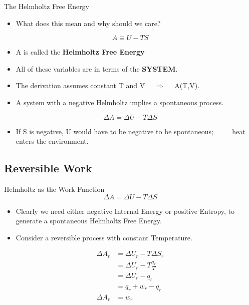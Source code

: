 \documentclass[t,10pt,mathserif,xcolor=pst,pdftex]{beamer}
\newcommand{\be}{\begin{equation}}
\newcommand{\ee}{\end{equation}}
\begin{document}
\begin{frame}{The Helmholtz Free Energy}
\begin{itemize}
\item What does this mean and why should we care?
\end{itemize}
\be
A \equiv U - TS
\ee

\begin{itemize}
\item A is called the \textbf{Helmholtz Free Energy}
\end{itemize}

\begin{itemize}
\item All of these variables are in terms of the \textbf{SYSTEM}.
\end{itemize}

\begin{itemize}
\item The derivation assumes constant T and V $\quad \Rightarrow \quad$ A(T,V). 
\end{itemize}

\begin{itemize}
\item  A system with a negative Helmholtz implies a spontaneous process.
\end{itemize}

\be
\Delta A = \Delta U - T\Delta S
\ee

\begin{itemize}
\item  If S is negative, U would have to be negative to be spontaneous; $\qquad$ heat enters the environment.
\end{itemize}

\end{frame}

\subsection{Reversible Work}

\begin{frame}{Helmholtz as the Work Function}
\be
\Delta A = \Delta U - T\Delta S
\ee


\begin{itemize}
\item Clearly we need either negative Internal Energy or positive Entropy, to generate a spontaneous Helmholtz Free Energy.
\end{itemize}

\begin{itemize}
\item Consider a reversible process with constant Temperature.
\end{itemize}
\be
    \begin{split}
        \Delta A_r &= \Delta U_r - T\Delta S_r \\
        &= \Delta U_r - T\frac{q_r}{T} \\
        &= \Delta U_r - q_r \\
        &= q_r + w_r - q_r \\
        \Delta A_r &= w_r
    \end{split}
\ee

\end{frame}
\end{document}

